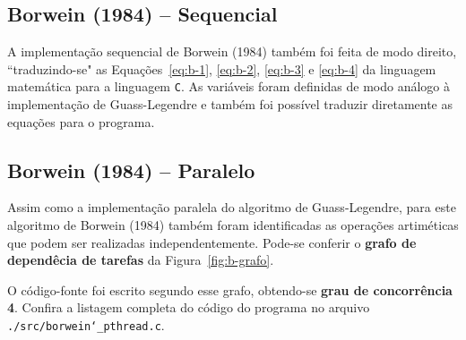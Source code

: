 \newpage
\subsection{Borwein (1984) -- Sequencial}

A implementação sequencial de Borwein (1984) também foi feita de modo direito, ``traduzindo-se" as Equações~\ref{eq:b-1}, \ref{eq:b-2}, \ref{eq:b-3} e \ref{eq:b-4} da linguagem matemática para a linguagem \texttt{C}. As variáveis foram definidas de modo análogo à implementação de Guass-Legendre e também foi possível traduzir diretamente as equações para o programa.

\subsection{Borwein (1984) -- Paralelo}

Assim como a implementação paralela do algoritmo de Guass-Legendre, para este algoritmo de Borwein (1984) também foram identificadas as operações artiméticas que podem ser realizadas independentemente. Pode-se conferir o \textbf{grafo de dependêcia de tarefas} da Figura~\ref{fig:b-grafo}.

O código-fonte foi escrito segundo esse grafo, obtendo-se \textbf{grau de concorrência 4}. Confira a listagem completa do código do programa no arquivo \texttt{./src/borwein\char`_pthread.c}.


